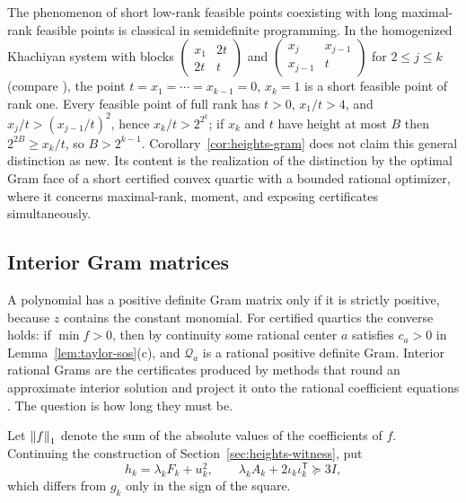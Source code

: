 The phenomenon of short low-rank feasible points coexisting with long
maximal-rank feasible points is classical in semidefinite programming. In
the homogenized Khachiyan system with blocks
$\left(\begin{smallmatrix}x_1&2t\\2t&t\end{smallmatrix}\right)$ and
$\left(\begin{smallmatrix}x_j&x_{j-1}\\x_{j-1}&t\end{smallmatrix}\right)$
for $2\le j\le k$ (compare \cite{PatakiTouzov2024}), the point $t=x_1=\cdots=
x_{k-1}=0$, $x_k=1$ is a short feasible point of rank one. Every feasible
point of full rank has $t>0$, $x_1/t>4$, and $x_j/t>(x_{j-1}/t)^2$, hence
$x_k/t>2^{2^k}$; if $x_k$ and $t$ have height at most $B$ then
$2^{2B}\ge x_k/t$, so $B>2^{k-1}$. Corollary~\ref{cor:heights-gram} does not
claim this general distinction as new. Its content is the realization of the
distinction by the optimal Gram face of a short certified convex quartic with
a bounded rational optimizer, where it concerns maximal-rank, moment, and
exposing certificates simultaneously.

\subsection{Interior Gram matrices}
\label{sec:heights-interior}

A polynomial has a positive definite Gram matrix only if it is strictly
positive, because $z$ contains the constant monomial. For certified quartics
the converse holds: if $\min f>0$, then by continuity some rational center
$a$ satisfies $c_a>0$ in Lemma~\ref{lem:taylor-sos}(c), and $\mathcal Q_a$ is
a rational positive definite Gram. Interior rational Grams are the
certificates produced by methods that round an approximate interior solution
and project it onto the rational coefficient equations
\cite{PeyrlParrilo2008}. The question is how long they must be.

Let $\left\lVert f\right\rVert_1$ denote the sum of the absolute values of the coefficients of
$f$. Continuing the construction of Section~\ref{sec:heights-witness}, put
\begin{equation}
 h_k=\lambda_kF_k+u_k^2,\qquad
 \lambda_kA_k+2\iota_k\iota_k^{\mathsf T}\succeq3I,
 \label{eq:heights-interior-family}
\end{equation}
which differs from $g_k$ only in the sign of the square.

